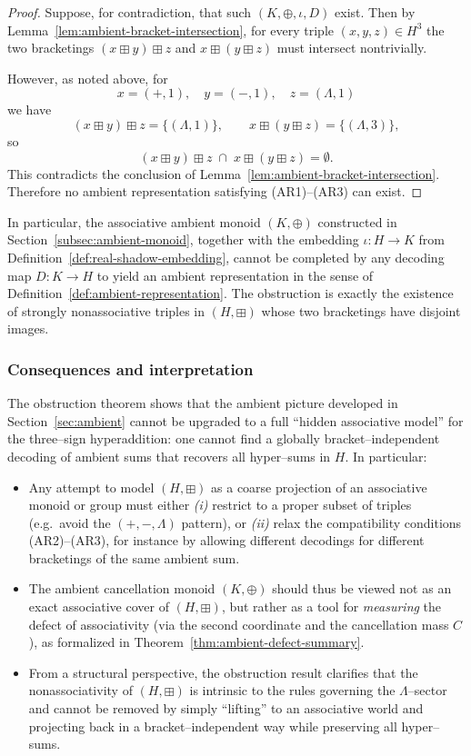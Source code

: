 \documentclass[11pt]{amsart}
\numberwithin{equation}{section}
\theoremstyle{definition}
\theoremstyle{remark}
\newcommand{\Hnum}{H}                      %
\newcommand{\Kamb}{K}                      %
\newcommand{\op}{\boxplus}                 %
\newcommand{\Cfun}{C}                      %
\begin{document}
\begin{proof}
Suppose, for contradiction, that such $(K,\oplus,\iota,D)$ exist.
Then by Lemma~\ref{lem:ambient-bracket-intersection}, for every triple
$(x,y,z)\in\Hnum^3$ the two bracketings $(x\op y)\op z$ and
$x\op(y\op z)$ must intersect nontrivially.

However, as noted above, for
\[
  x=(+,1),\quad y=(-,1),\quad z=(\Lambda,1)
\]
we have
\[
  (x\op y)\op z
  = \{(\Lambda,1)\},
  \qquad
  x\op(y\op z)
  = \{(\Lambda,3)\},
\]
so
\[
  (x\op y)\op z
  \;\cap\;
  x\op(y\op z)
  = \emptyset.
\]
This contradicts the conclusion of Lemma~\ref{lem:ambient-bracket-intersection}.
Therefore no ambient representation satisfying (AR1)--(AR3) can exist.
\end{proof}

In particular, the associative ambient monoid $(\Kamb,\oplus)$
constructed in Section~\ref{subsec:ambient-monoid}, together with the
embedding $\iota:\Hnum\to\Kamb$ from
Definition~\ref{def:real-shadow-embedding}, cannot be completed by any
decoding map $D:\Kamb\to\Hnum$ to yield an ambient representation in
the sense of Definition~\ref{def:ambient-representation}.  The
obstruction is exactly the existence of strongly nonassociative
triples in $(\Hnum,\op)$ whose two bracketings have disjoint images.

\subsubsection*{Consequences and interpretation}

The obstruction theorem shows that the ambient picture developed in
Section~\ref{sec:ambient} cannot be upgraded to a full ``hidden
associative model'' for the three--sign hyperaddition: one cannot find
a globally bracket–independent decoding of ambient sums that recovers
all hyper–sums in $\Hnum$.  In particular:

\begin{itemize}[leftmargin=2em]
  \item Any attempt to model $(\Hnum,\op)$ as a coarse projection of
        an associative monoid or group must either
        \emph{(i)} restrict to a proper subset of triples (e.g.\ avoid
        the $(+,-,\Lambda)$ pattern), or
        \emph{(ii)} relax the compatibility conditions (AR2)–(AR3),
        for instance by allowing different decodings for different
        bracketings of the same ambient sum.
  \item The ambient cancellation monoid $(\Kamb,\oplus)$ should thus
        be viewed not as an exact associative cover of
        $(\Hnum,\op)$, but rather as a tool for \emph{measuring} the
        defect of associativity (via the second coordinate and the
        cancellation mass $\Cfun$), as formalized in
        Theorem~\ref{thm:ambient-defect-summary}.
  \item From a structural perspective, the obstruction result clarifies that
        the nonassociativity of $(\Hnum,\op)$ is intrinsic to the
        rules governing the $\Lambda$–sector and cannot be removed by
        simply ``lifting'' to an associative world and projecting
        back in a bracket–independent way while preserving all
        hyper–sums.
\end{itemize}
\end{document}
